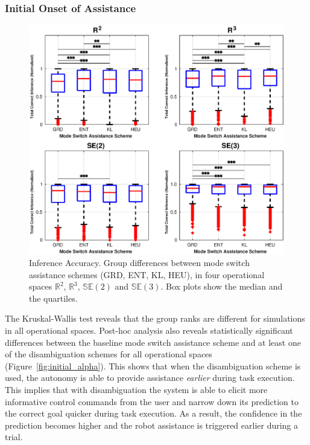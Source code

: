 \documentclass[conference]{IEEEtran}
\begin{document}
\subsubsection{Initial Onset of Assistance}
\begin{figure}[t!]
	\centering
	\includegraphics[width= 1.\hsize, height=0.5\vsize]{./figures/correct_inference.eps}
	\vspace{-0.75cm}
	\caption{Inference Accuracy. Group differences between mode switch assistance schemes (GRD, ENT, KL, HEU), in four operational spaces $\mathbb{R}^2$, $\mathbb{R}^3$, $\mathbb{SE}(2)$ and $\mathbb{SE}(3)$. Box plots show the median and the quartiles.} 
	\label{fig:correct_inference}
\end{figure}

The Kruskal-Wallis test reveals that the group ranks are different for simulations in all operational spaces. Post-hoc analysis also reveals statistically significant differences between the baseline mode switch assistance scheme and at least one of the disambiguation schemes for all operational spaces (Figure~\ref{fig:initial_alpha}). This shows that when the disambiguation scheme is used, the autonomy is able to provide assistance \textit{earlier} during task execution. This implies that with disambiguation the system is able to elicit more informative control commands from the user and narrow down its prediction to the correct goal quicker during task execution. As a result, the confidence in the prediction becomes higher and the robot assistance is triggered earlier during a trial. 
\end{document}
